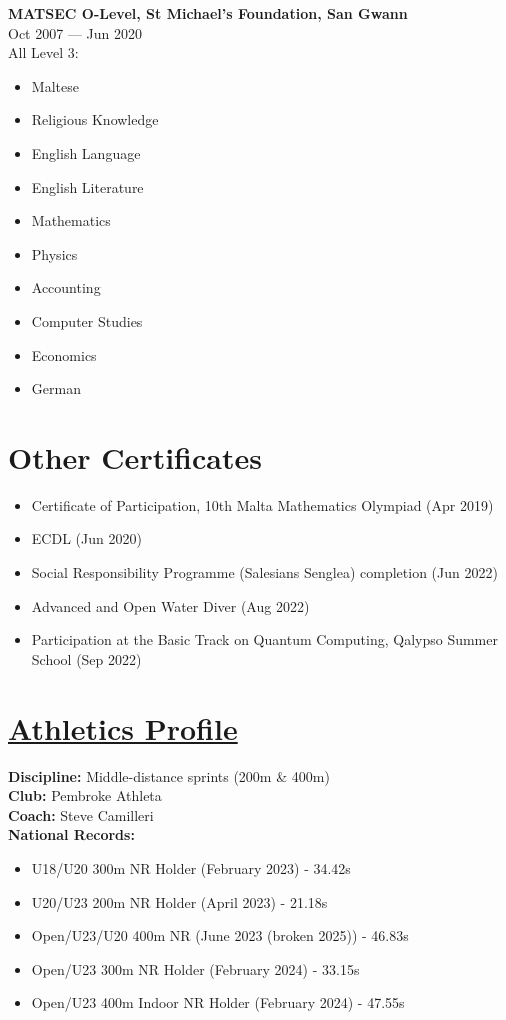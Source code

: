 \documentclass[11pt,a4paper]{article}
\newcommand{\entry}[3]{%
  \noindent\textbf{#1}\\[-1pt]
  \textcolor{muted}{#2}\\
  \color{text}#3\par\vspace{0.6em}}
\begin{document}
\entry{MATSEC O-Level, St Michael's Foundation, San Gwann}{Oct 2007 — Jun 2020}{All Level 3: \begin{itemize}
  \item Maltese
  \item Religious Knowledge
  \item English Language
  \item English Literature
  \item Mathematics
  \item Physics 
  \item Accounting
  \item Computer Studies
  \item Economics
  \item German
\end{itemize}}

\section*{Other Certificates}
\begin{itemize}
  \item Certificate of Participation, 10th Malta Mathematics Olympiad (Apr 2019)
  \item ECDL (Jun 2020)
  \item Social Responsibility Programme (Salesians Senglea) completion (Jun 2022)
  \item Advanced and Open Water Diver (Aug 2022)
  \item Participation at the Basic Track on Quantum Computing, Qalypso Summer School (Sep 2022)
\end{itemize}
\pagebreak
\vspace*{2em}

\section*{\href{https://www.worldathletics.org/athletes/malta/graham-pellegrini-147123}{Athletics Profile}}

\textbf{Discipline:} Middle-distance sprints (200m \& 400m)\\
\textbf{Club:} Pembroke Athleta\\
\textbf{Coach:} Steve Camilleri\\

\noindent
\textbf{National Records:}
\begin{itemize}
  \item U18/U20 300m NR Holder (February 2023) - 34.42s
  \item U20/U23 200m NR Holder (April 2023) - 21.18s
  \item Open/U23/U20 400m NR  (June 2023 (broken 2025)) - 46.83s
  \item Open/U23 300m NR Holder (February 2024) - 33.15s
  \item Open/U23 400m Indoor NR Holder (February 2024) - 47.55s

\end{itemize}
\end{document}
